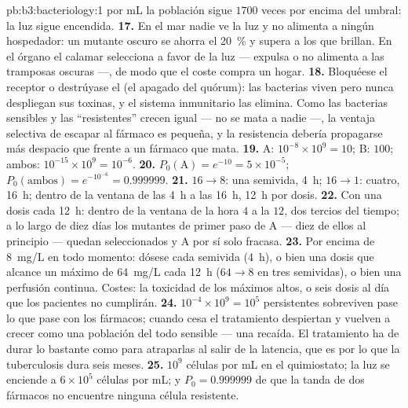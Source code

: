 \begin{solution}{pb:b3:bacteriology:1}
por mL la población sigue $1700$ veces por encima del umbral: la luz
sigue encendida.
\textbf{17.} En el mar nadie ve la luz y no alimenta a ningún
hospedador: un mutante oscuro se ahorra el \qty{20}{\%} y supera a los
que brillan. En el órgano el calamar selecciona a favor de la luz ---
expulsa o no alimenta a las tramposas oscuras ---, de modo que el coste
compra un hogar.
\textbf{18.} Bloquéese el receptor o destrúyase el  (el
apagado del quórum): las bacterias viven pero nunca despliegan sus
toxinas, y el sistema inmunitario las elimina. Como las bacterias
sensibles y las ``resistentes'' crecen igual --- no se mata a nadie ---,
la ventaja selectiva de escapar al fármaco es pequeña, y la resistencia
debería propagarse más despacio que frente a un fármaco que mata.
\textbf{19.} A: $10^{-8}\times 10^{9} = 10$; B: $100$; ambos: $10^{-15}\times
10^{9} = 10^{-6}$.
\textbf{20.} $P_{0}(\text{A}) = e^{-10} = 5\times 10^{-5}$;
$P_{0}(\text{ambos}) = e^{-10^{-6}} = 0.999999$.
\textbf{21.} $16 \to 8$: una semivida, \qty{4}{h}; $16 \to 1$: cuatro,
\qty{16}{h}; dentro de la ventana de las \qty{4}{h} a las \qty{16}{h},
\qty{12}{h} por dosis.
\textbf{22.} Con una dosis cada \qty{12}{h}: dentro de la ventana de la
hora $4$ a la $12$, dos tercios del tiempo; a lo largo de diez días los
mutantes de primer paso de A --- diez de ellos al principio --- quedan
seleccionados y A por sí solo fracasa.
\textbf{23.} Por encima de \qty{8}{mg/L} en todo momento: dósese cada
semivida (\qty{4}{h}), o bien una dosis que alcance un máximo de
\qty{64}{mg/L} cada \qty{12}{h} ($64 \to 8$ en tres semividas), o bien
una perfusión continua. Costes: la toxicidad de los máximos altos, o seis
dosis al día que los pacientes no cumplirán.
\textbf{24.} $10^{-4}\times 10^{9} = 10^{5}$ persistentes sobreviven pase
lo que pase con los fármacos; cuando cesa el tratamiento despiertan y
vuelven a crecer como una población del todo sensible --- una recaída. El
tratamiento ha de durar lo bastante como para atraparlas al salir de la
latencia, que es por lo que la tuberculosis dura seis meses.
\textbf{25.} $10^{9}$ células por mL en el quimiostato; la luz se
enciende a $6\times 10^{5}$ células por mL; y $P_{0} = 0.999999$ de que
la tanda de dos fármacos no encuentre ninguna célula resistente.
\end{solution}
